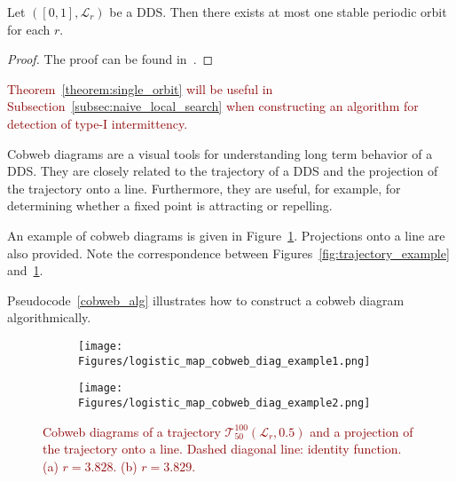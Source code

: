 \begin{theorem}
\label{theorem:single_orbit}
    Let $\left( [0, 1], \mathcal{L}_r\right)$ be a DDS. Then there exists at most one stable periodic orbit for each $r$.~\cite[p.~74]{Devaney20211026}
\end{theorem}

\begin{proof}
    The proof can be found in~\cite[p.~74]{Devaney20211026}.
\end{proof}

\begin{remark}
\textcolor{darkred}{
Theorem~\ref{theorem:single_orbit} will be useful in Subsection~\ref{subsec:naive_local_search} when constructing an algorithm for detection of type-I intermittency.
}
\end{remark}

\begin{remark}
\label{def:cobweb}
    Cobweb diagrams are a visual tools for understanding long term behavior of a DDS.
    They are closely related to the trajectory of a DDS and the projection of the trajectory onto a line.
    Furthermore, they are useful, for example, for determining whether a fixed point is attracting or repelling.
    \par
    An example of cobweb diagrams is given in Figure~\ref{fig:cobweb_diag_example}.
    Projections onto a line are also provided.
    Note the correspondence between Figures~\ref{fig:trajectory_example} and~\ref{fig:cobweb_diag_example}.
    \par
    Pseudocode~\ref{cobweb_alg} illustrates how to construct a cobweb diagram algorithmically.
\end{remark}

\begin{figure}[!h]
    \centering
    \begin{subfigure}{0.6\textwidth}
        \centering
        \texttt{[image: Figures/logistic\_map\_cobweb\_diag\_example1.png]}
        \caption{}
    \end{subfigure}
    \hfill
    \begin{subfigure}{0.6\textwidth}
        \centering
        \texttt{[image: Figures/logistic\_map\_cobweb\_diag\_example2.png]}
        \caption{}
    \end{subfigure}

    \caption{
        \textcolor{darkred}{
        Cobweb diagrams of a trajectory $\mathcal{T}_{50}^{100}(\mathcal{L}_{r}, 0.5)$ and a projection of the trajectory onto a line. 
        Dashed diagonal line: identity function. 
        (a) $r = 3.828$. 
        (b) $r = 3.829$. 
        }
        }
    \label{fig:cobweb_diag_example}
\end{figure}

